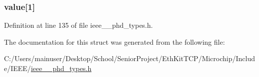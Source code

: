 \subsubsection[{value}]{ value\mbox{[}1\mbox{]}}\label{struct__octet__string_a60ac419fb75046efa2e20ee72ec2ea45}


Definition at line 135 of file ieee\+\_\+\_\+phd\+\_\+types.\+h.



The documentation for this struct was generated from the following file\+:\begin{DoxyCompactItemize}
\item 
C\+:/\+Users/mainuser/\+Desktop/\+School/\+Senior\+Project/\+Eth\+Kit\+T\+C\+P/\+Microchip/\+Include/\+I\+E\+E\+E/\hyperlink{ieee__11073__phd__types_8h}{ieee\+\_\+\_\+phd\+\_\+types.\+h}\end{DoxyCompactItemize}
